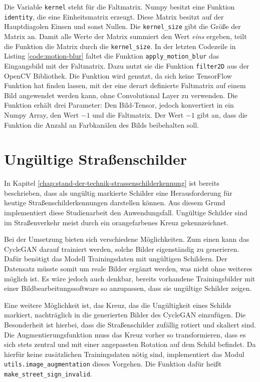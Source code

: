 Die Variable \texttt{kernel} steht für die Faltmatrix. Numpy besitzt eine Funktion \texttt{identity}, die eine Einheitsmatrix erzeugt. Diese Matrix besitzt auf der Hauptdiagolen Einsen und sonst Nullen. Die \texttt{kernel_size} gibt die Größe der Matrix an. Damit alle Werte der Matrix summiert den Wert \emph{eins} ergeben, teilt die Funktion die Matrix durch die \texttt{kernel_size}. In der letzten Codezeile in Listing \ref{code:motion-blur} faltet die Funktion \texttt{apply_motion_blur} das Eingangsbild mit der Faltmatrix. Dazu nutzt sie die Funktion \texttt{filter2D} aus der OpenCV Bibliothek. Die Funktion wird genutzt, da sich keine TensorFlow Funktion hat finden lassen, mit der eine derart definierte Faltmatrix auf einem Bild angewendet werden kann, ohne Convolutional Layer zu verwenden. Die Funktion erhält drei Parameter: Den Bild-Tensor, jedoch konvertiert in ein Numpy Array, den Wert $-1$ und die Faltmatrix. Der Wert $-1$ gibt an, dass die Funktion die Anzahl an Farbkanälen des Bilds beibehalten soll.


\section{Ungültige Straßenschilder}
In Kapitel \ref{chap:stand-der-technik-strassenschilderkennung} ist bereits beschrieben, dass als ungültig markierte Schilder eine Herausforderung für heutige Straßenschilderkennungen darstellen können. Aus diesem Grund implementiert diese Studienarbeit den Anwendungsfall. Ungültige Schilder sind im Straßenverkehr meist durch ein orangefarbenes Kreuz gekennzeichnet.

Bei der Umsetzung bieten sich verschiedene Möglichkeiten. Zum einen kann das \ac{CycleGAN} darauf trainiert werden, solche Bilder eigenständig zu generieren. Dafür benötigt das Modell Trainingsdaten mit ungültigen Schildern. Der Datensatz müsste somit um reale Bilder ergänzt werden, was nicht ohne weiteres möglich ist. Es wäre jedoch auch denkbar, bereits vorhandene Trainingsbilder mit einer Bildbearbeitungssoftware so anzupassen, dass sie ungültige Schilder zeigen.

Eine weitere Möglichkeit ist, das Kreuz, das die Ungültigkeit eines Schilds markiert, nachträglich in die generierten Bilder des \ac{CycleGAN} einzufügen. Die Besonderheit ist hierbei, dass die Straßenschilder zufällig rotiert und skaliert sind. Die Augmentierungsfunktion muss das Kreuz vorher so transformieren, dass es sich stets zentral und mit einer angepassten Rotation auf dem Schild befindet. Da hierfür keine zusätzlichen Trainingsdaten nötig sind, implementiert das Modul  \texttt{utils.image_augmentation} dieses Vorgehen. Die Funktion dafür heißt \texttt{make_street_sign_invalid}. 

